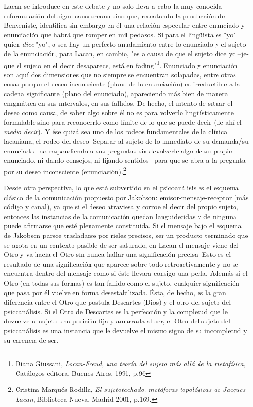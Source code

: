 \documentclass{book}
\begin{document}
Lacan se introduce en este debate y no solo lleva a cabo la muy conocida
reformulación del signo saussureano sino que, rescatando la producción
de Benveniste, identifica sin embargo en él una relación especular entre
enunciado y enunciación que habrá que romper en mil pedazos. Si para el
lingüista es "yo" quien \emph{dice} "yo", o sea hay un perfecto
anudamiento entre lo enunciado y el sujeto de la enunciación, para
Lacan, en cambio, "es a causa de que el sujeto dice yo --je- que el
sujeto en el decir desaparece, está en fading"\footnote{Diana Giussani,
  \emph{Lacan-Freud}, \emph{una teoría del sujeto más allá de la
  metafísica,} Catálogos editora, Buenos Aires, 1991, p.96}. Enunciado y
enunciación son aquí dos dimensiones que no siempre se encuentran
solapadas, entre otras cosas porque el deseo inconsciente (plano de la
enunciación) es irreductible a la cadena significante (plano del
enunciado), apareciendo más bien de manera enigmática en sus intervalos,
en sus fallidos. De hecho, el intento de situar el deseo como causa, de
saber algo sobre él no es para volverlo lingüísticamente formulable sino
para reconocerlo como límite de lo que se puede decir (de ahí el
\emph{medio decir}). Y ése quizá sea uno de los rodeos fundamentales de
la clínica lacaniana, el rodeo del deseo. Separar al sujeto de lo
inmediato de su demanda/su enunciado --no respondiendo a sus preguntas
sin devolverle algo de su propio enunciado, ni dando consejos, ni
fijando sentidos-- para que se abra a la pregunta por su deseo
inconsciente (enunciación).\footnote{Cristina Marqués Rodilla, \emph{El
  sujetotachado, metáforas topológicas de Jacques Lacan}, Biblioteca
  Nueva, Madrid 2001, p.169.}

Desde otra perspectiva, lo que está subvertido en el psicoanálisis es el
esquema clásico de la comunicación propuesto por Jakobson:
emisor-mensaje-receptor (más código y canal), ya que si el deseo
atraviesa y corroe el decir del propio sujeto, entonces las instancias
de la comunicación quedan languidecidas y de ninguna puede afirmarse que
esté plenamente constituida. Si el mensaje bajo el esquema de Jakobson
parece trasladarse por rieles precisos, ser un producto terminado que se
agota en un contexto pasible de ser saturado, en Lacan el mensaje viene
del Otro y va hacia el Otro sin nunca hallar una significación precisa.
Esto es el resultado de una significación que aparece sobre todo
retroactivamente y no se encuentra dentro del mensaje como si éste
llevara consigo una perla. Además si el Otro (en todas sus formas) es
tan fallido como el sujeto, cualquier significación que pasa por él
vuelve en forma desestabilizada. Ésta, de hecho, es la gran diferencia
entre el Otro que postula Descartes (Dios) y el otro del sujeto del
psicoanálisis. Si el Otro de Descartes es la perfección y la completud
que le devuelve al sujeto una posición fija y amarrada al ser, el Otro
del sujeto del psicoanálisis es una instancia que le devuelve el mismo
signo de su incompletud y su carencia de ser.
\end{document}
